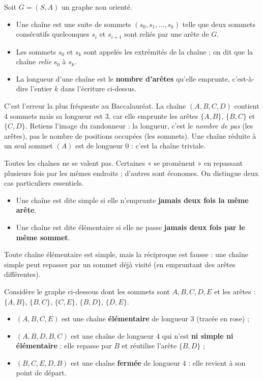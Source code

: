 \documentclass[11pt]{article}
\newcommand{\cle}[1]{{\popxbold\color{popdark}#1}}
\begin{document}
\begin{definition}
Soit $G = (S, A)$ un graphe non orienté.
\begin{itemize}
\item Une \cle{chaîne} est une suite de sommets $(s_0, s_1, \dots, s_k)$ telle que deux sommets consécutifs quelconques $s_i$ et $s_{i+1}$ sont reliés par une arête de $G$.
\item Les sommets $s_0$ et $s_k$ sont appelés les \cle{extrémités} de la chaîne ; on dit que la chaîne \emph{relie} $s_0$ à $s_k$.
\item La \cle{longueur} d'une chaîne est le \textbf{nombre d'arêtes} qu'elle emprunte, c'est-à-dire l'entier $k$ dans l'écriture ci-dessus.
\end{itemize}
\end{definition}

\begin{attention}[Longueur = nombre d'arêtes, pas de sommets]
C'est l'erreur la plus fréquente au Baccalauréat. La chaîne $(A, B, C, D)$ contient $4$ sommets mais sa longueur est $3$, car elle emprunte les arêtes $\{A,B\}$, $\{B,C\}$ et $\{C,D\}$. Retiens l'image du randonneur : la longueur, c'est le \emph{nombre de pas} (les arêtes), pas le nombre de positions occupées (les sommets). Une chaîne réduite à un seul sommet $(A)$ est de longueur $0$ : c'est la chaîne triviale.
\end{attention}

Toutes les chaînes ne se valent pas. Certaines « se promènent » en repassant plusieurs fois par les mêmes endroits ; d'autres sont économes. On distingue deux cas particuliers essentiels.

\begin{definition}
\begin{itemize}
\item Une chaîne est dite \cle{simple} si elle n'emprunte \textbf{jamais deux fois la même arête}.
\item Une chaîne est dite \cle{élémentaire} si elle ne passe \textbf{jamais deux fois par le même sommet}.
\end{itemize}
Toute chaîne élémentaire est simple, mais la réciproque est fausse : une chaîne simple peut repasser par un sommet déjà visité (en empruntant des arêtes différentes).
\end{definition}

\begin{exemplebox}
Considère le graphe ci-dessous dont les sommets sont $A, B, C, D, E$ et les arêtes : $\{A,B\}$, $\{B,C\}$, $\{C,E\}$, $\{B,D\}$, $\{D,E\}$.
\begin{itemize}
\item $(A, B, C, E)$ est une chaîne \textbf{élémentaire} de longueur $3$ (tracée en rose) ;
\item $(A, B, D, B, C)$ est une chaîne de longueur $4$ qui n'est \textbf{ni simple ni élémentaire} : elle repasse par $B$ et réutilise l'arête $\{B,D\}$ ;
\item $(B, C, E, D, B)$ est une chaîne \textbf{fermée} de longueur $4$ : elle revient à son point de départ.
\end{itemize}
\end{exemplebox}
\end{document}
